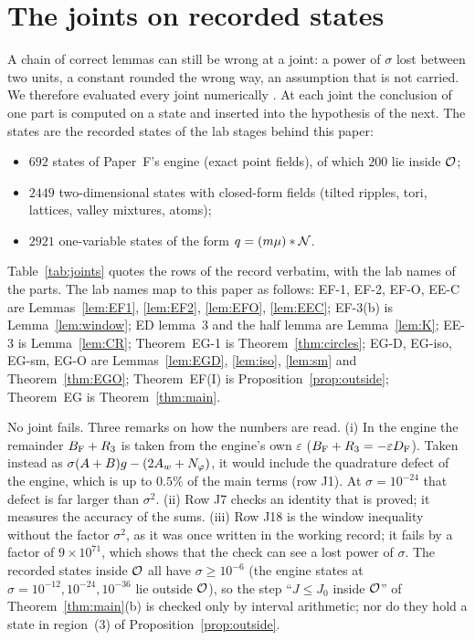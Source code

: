 \section{The joints on recorded states}
\label{app:joints}

A chain of correct lemmas can still be wrong at a joint: a power of $\sigma$ lost between two units, a constant rounded the wrong way, an assumption that is not carried.
We therefore evaluated every joint numerically \numst.
At each joint the conclusion of one part is computed on a state and inserted into the hypothesis of the next.
The states are the recorded states of the lab stages behind this paper:
\begin{itemize}
\item $692$ states of Paper~F's engine (exact point fields), of which $200$ lie inside $\mathcal O$;
\item $2449$ two-dimensional states with closed-form fields (tilted ripples, tori, lattices, valley mixtures, atoms);
\item $2921$ one-variable states of the form $q=(m\mu)*\mathcal N$.
\end{itemize}
Table~\ref{tab:joints} quotes the rows of the record  verbatim, with the lab names of the parts.
The lab names map to this paper as follows: EF-1, EF-2, EF-O, EE-C are Lemmas~\ref{lem:EF1}, \ref{lem:EF2}, \ref{lem:EFO}, \ref{lem:EEC}; EF-3(b) is Lemma~\ref{lem:window}; ED lemma~3 and the half lemma are Lemma~\ref{lem:K}; EE-3 is Lemma~\ref{lem:CR}; Theorem~EG-1 is Theorem~\ref{thm:circles}; EG-D, EG-iso, EG-sm, EG-O are Lemmas~\ref{lem:EGD}, \ref{lem:iso}, \ref{lem:sm} and Theorem~\ref{thm:EGO}; Theorem~EF(I) is Proposition~\ref{prop:outside}; Theorem~EG is Theorem~\ref{thm:main}.

No joint fails.
Three remarks on how the numbers are read.
(i) In the engine the remainder $B_{\mathrm F}+R_3$ is taken from the engine's own $\varepsilon$ ($B_{\mathrm F}+R_3=-\varepsilon D_{\rm F}$).
Taken instead as $\sigma(A+B)g-(2A_w+N_\varphi)$, it would include the quadrature defect of the engine, which is up to $0.5\%$ of the main terms (row J1).
At $\sigma=10^{-24}$ that defect is far larger than $\sigma^2$.
(ii) Row J7 checks an identity that is proved; it measures the accuracy of the sums.
(iii) Row J18 is the window inequality without the factor $\sigma^2$, as it was once written in the working record; it fails by a factor of $9\times10^{71}$, which shows that the check can see a lost power of $\sigma$.
The recorded states inside $\mathcal O$ all have $\sigma\ge10^{-6}$ (the engine states at $\sigma=10^{-12},10^{-24},10^{-36}$ lie outside $\mathcal O$), so the step ``$J\le J_0$ inside $\mathcal O$'' of Theorem~\ref{thm:main}(b) is checked only by interval arithmetic; nor do they hold a state in region~(3) of Proposition~\ref{prop:outside}.


